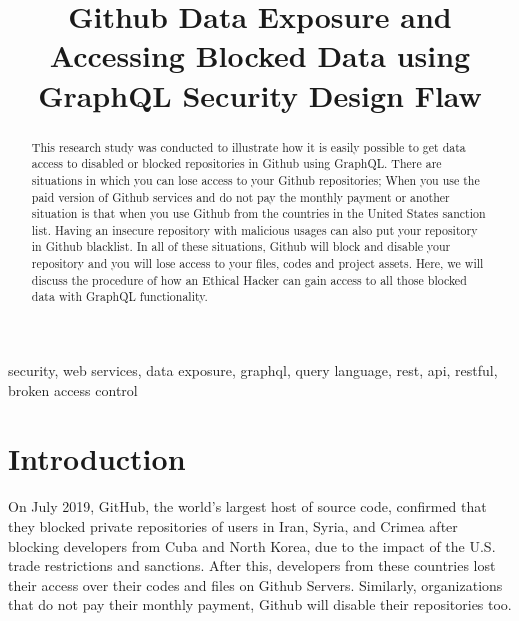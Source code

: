 \documentclass[conference]{IEEEtran}
\begin{document}
\title{Github Data Exposure and\\ Accessing Blocked Data using\\ GraphQL Security Design Flaw} %

\author{
}

\maketitle

\begin{abstract}
This research study was conducted to illustrate how it is easily possible to get data access to disabled or blocked repositories in Github using GraphQL. There are situations in which you can lose access to your Github repositories; When you use the paid version of Github services and do not pay the monthly payment or another situation is that when you use Github from the countries in the United States sanction list. Having an insecure repository with malicious usages can also put your repository in Github blacklist. In all of these situations, Github will block and disable your repository and you will lose access to your files, codes and project assets. Here, we will discuss the procedure of how an Ethical Hacker can gain access to all those blocked data with GraphQL functionality.
\end{abstract}

\begin{IEEEkeywords}
security, web services, data exposure, graphql, query language, rest, api, restful, broken access control
\end{IEEEkeywords}

\section{Introduction}

On July 2019, GitHub, the world’s largest host of source code, confirmed that they blocked private repositories of users in Iran, Syria, and Crimea after blocking developers from Cuba and North Korea, due to the impact of the U.S. trade restrictions and sanctions. After this, developers from these countries lost their access over their codes and files on Github Servers. Similarly, organizations that do not pay their monthly payment, Github will disable their repositories too. 
\end{document}
